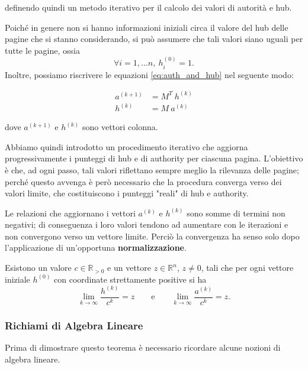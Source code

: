 definendo quindi un metodo iterativo per il calcolo dei valori di autorità e hub.

Poiché in genere non si hanno informazioni iniziali circa il valore del hub delle pagine che si stanno considerando, si può assumere che tali valori siano uguali per tutte le pagine, ossia
\[
\forall i = 1, \dots n,\ h_i^{(0)} = 1.
\]
Inoltre, possiamo riscrivere le equazioni \eqref{eq:auth_and_hub} nel seguente modo:

\begin{equation}
\begin{split}
    a^{(k+1)} &= M^T\ h^{(k)} \\
    h^{(k)} &= M\ a^{(k)}
\end{split}
\end{equation}

dove $a^{(k+1)}$ e $h^{(k)}$ sono vettori colonna.

Abbiamo quindi introdotto un procedimento iterativo che aggiorna progressivamente i punteggi di hub e di authority per ciascuna pagina. L'obiettivo è che, ad ogni passo, tali valori riflettano sempre meglio la rilevanza delle pagine; perché questo avvenga è però necessario che la procedura converga verso dei valori limite, che costituiscono i punteggi "reali" di hub e authority.

Le relazioni che aggiornano i vettori $a^{(k)}$ e $h^{(k)}$ sono somme di termini non negativi; di conseguenza i loro valori tendono ad aumentare con le iterazioni e non convergono verso un vettore limite. Perciò la convergenza ha senso solo dopo l'applicazione di un'opportuna \textbf{normalizzazione}.

\begin{teorema}\label{teo:th_hits}
    Esistono un valore \(c\in\mathbb{R}_{>0}\) e un vettore \(z\in\mathbb{R}^n\), \(z\neq 0\), tali che per ogni vettore iniziale \(h^{(0)}\) con coordinate strettamente positive si ha
    \[
        \lim_{k\to\infty}\frac{h^{(k)}}{c^k}=z
        \qquad\text{e}\qquad
        \lim_{k\to\infty}\frac{a^{(k)}}{c^k}=z.
    \]
\end{teorema}

\newpage

\subsubsection{Richiami di Algebra Lineare}

Prima di dimostrare questo teorema è necessario ricordare alcune nozioni di algebra lineare.

